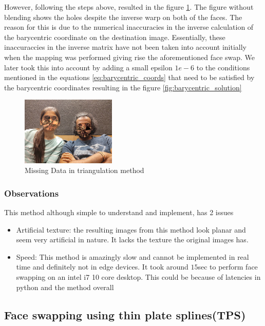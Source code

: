 \documentclass[conference]{IEEEtran}
\begin{document}
However, following the steps above, resulted in the figure \ref{fig:barycentric_problem}. The figure without blending shows the holes despite the inverse warp on both of the faces. The reason for this is due to the numerical inaccuracies in the inverse calculation of the barycentric coordinate on the destination image. Essentially, these inaccuraccies in the inverse matrix have not been taken into account initially when the mapping was performed giving rise the aforementioned face swap. We later took this into account by adding a small epsilon $1e-6$ to the conditions mentioned in the equations \ref{eq:barycentric_coords} that need to be satisfied by the barycentric coordinates resulting in the figure \ref{fig:barycentric_solution} 
\begin{figure}[]
    \centering
    \includegraphics[width=0.4\textwidth]{media/incorrect_triangulation_output.png}
    \caption{Missing Data in triangulation method}
    \label{fig:barycentric_problem}
\end{figure}

\subsubsection{Observations}
This method although simple to understand and implement, has 2 issues 
\begin{itemize}
    \item Artificial texture: the resulting images from this method look planar and seem very artificial in nature. It lacks the texture the original images has.
    \item Speed: This method is amazingly slow and cannot be implemented in real time and definitely not in edge devices. It took around $15$sec to perform face swapping on an intel i7 10 core desktop. This could be because of latencies in python and the method overall
\end{itemize}


\subsection{Face swapping using thin plate splines(TPS)}
\end{document}
